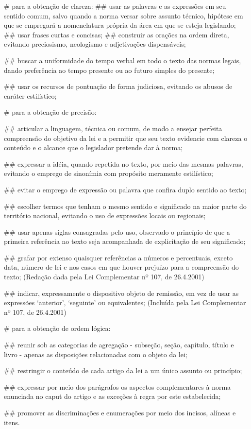 \documentclass[a4paper,capitulo,titlepage=false]{br-lex}
\begin{document}
\begin{easylist}
	# para a obtenção de clareza:
	## usar as palavras e as expressões em seu sentido comum, salvo quando a norma versar sobre assunto técnico, hipótese em que se empregará a nomenclatura própria da área em que se esteja legislando;
	##  usar frases curtas e concisas;
	## construir as orações na ordem direta, evitando preciosismo, neologismo e adjetivações dispensáveis;
	
	## buscar a uniformidade do tempo verbal em todo o texto das normas legais, dando preferência ao tempo presente ou ao futuro simples do presente;
	
	## usar os recursos de pontuação de forma judiciosa, evitando os abusos de caráter estilístico;
	
	# para a obtenção de precisão:
	
	## articular a linguagem, técnica ou comum, de modo a ensejar perfeita compreensão do objetivo da lei e a permitir que seu texto evidencie com clareza o conteúdo e o alcance que o legislador pretende dar à norma;
	
	## expressar a idéia, quando repetida no texto, por meio das mesmas palavras, evitando o emprego de sinonímia com propósito meramente estilístico;
	
	## evitar o emprego de expressão ou palavra que confira duplo sentido ao texto;
	
	## escolher termos que tenham o mesmo sentido e significado na maior parte do território nacional, evitando o uso de expressões locais ou regionais;
	
	## usar apenas siglas consagradas pelo uso, observado o princípio de que a primeira referência no texto seja acompanhada de explicitação de seu significado;
	
	
	## grafar por extenso quaisquer referências a números e percentuais, exceto data, número de lei e nos casos em que houver prejuízo para a compreensão do texto;     (Redação dada pela Lei Complementar nº 107, de 26.4.2001)
	
	## indicar, expressamente o dispositivo objeto de remissão, em vez de usar as expressões ‘anterior’, ‘seguinte’ ou equivalentes;     (Incluída pela Lei Complementar nº 107, de 26.4.2001)
	
	# para a obtenção de ordem lógica:
	
## reunir sob as categorias de agregação - subseção, seção, capítulo, título e livro - apenas as disposições relacionadas com o objeto da lei;
	
	## restringir o conteúdo de cada artigo da lei a um único assunto ou princípio;
	
	## expressar por meio dos parágrafos os aspectos complementares à norma enunciada no caput do artigo e as exceções à regra por este estabelecida;
	
	## promover as discriminações e enumerações por meio dos incisos, alíneas e itens.
	\end{easylist}
\end{document}
